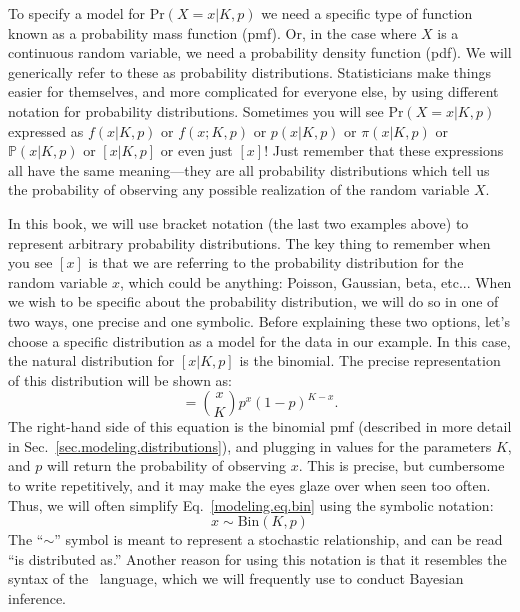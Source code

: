 To specify a model for $\text{Pr}(X=x|K,p)$ we need a specific type of
function known as a probability mass function (pmf). Or, in the case
where $X$ is a continuous random variable, we need a probability density function
(pdf). We will generically refer to these as probability distributions.
Statisticians make things easier for themselves,
and more complicated for everyone else, by using different notation
for probability distributions. Sometimes you will see
$\text{Pr}(X=x|K,p)$ expressed as $f(x|K,p)$ or $f(x; K,p)$ or
$p(x|K,p)$ or $\pi(x|K,p)$ or $\mathbb{P}(x|K,p)$ or $[x|K,p]$ or even
just $[x]$! Just remember that these expressions all have the same
meaning---they are all probability distributions which tell us the
probability of observing any possible realization of the random
variable $X$.

In this book, we will use bracket notation (the last two
examples above) to represent arbitrary probability distributions. The
key thing to remember when you see $[x]$ is that we are referring to
the probability distribution for the random variable $x$, which could
be anything: Poisson, Gaussian, beta, etc... When
we wish to be specific about the probability distribution, we will do
so in one of two ways, one precise and one symbolic. Before explaining
these two options, let's choose a specific distribution as a model for
the data in our example. In this case, the natural distribution for
$[x|K,p]$ is the binomial. The precise representation of this
distribution will be shown as:
\begin{equation}
  [x|K,p] = %
             \binom{x}{K}p^x(1-p)^{K-x}.
  \label{modeling.eq.bin}
\end{equation}
The right-hand side of this equation is the binomial pmf (described in
more detail in Sec.~\ref{sec.modeling.distributions}), and plugging in
values for the parameters $K$, and $p$ will return the probability of
observing $x$. This is precise, but cumbersome to write repetitively,
and it may make the eyes glaze over when seen too often. Thus, we will
often simplify Eq.~\ref{modeling.eq.bin} using the symbolic notation:
\begin{equation}
  x \sim \text{Bin}(K, p)
  \label{modeling.eq.binsym}
\end{equation}
The ``$\sim$'' symbol is meant to represent a stochastic relationship, and
can be read ``is distributed as.''
Another reason for using this notation is that
it resembles the syntax of the \bugs~language, which we will
frequently use to conduct Bayesian inference.

